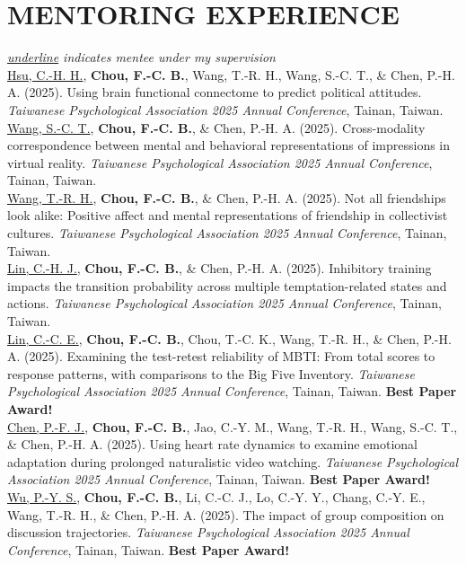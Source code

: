 \documentclass[a4paper,12pt]{article}
\newcommand{\itemspace}{7pt} %
\begin{document}
\section*{MENTORING EXPERIENCE}
\textit{\underline{underline} indicates mentee under my supervision} \\[10pt]
\noindent \underline{Hsu, C.-H. H.}, \textbf{Chou, F.-C. B.}, Wang, T.-R. H., Wang, S.-C. T., \& Chen, P.-H. A. (2025). Using brain functional connectome to predict political attitudes. \textit{Taiwanese Psychological Association 2025 Annual Conference}, Tainan, Taiwan. \\[\itemspace]
\noindent \underline{Wang, S.-C. T.}, \textbf{Chou, F.-C. B.}, \& Chen, P.-H. A. (2025). Cross-modality correspondence between mental and behavioral representations of impressions in virtual reality. \textit{Taiwanese Psychological Association 2025 Annual Conference}, Tainan, Taiwan. \\[\itemspace]
\noindent \underline{Wang, T.-R. H.}, \textbf{Chou, F.-C. B.}, \& Chen, P.-H. A. (2025). Not all friendships look alike: Positive affect and mental representations of friendship in collectivist cultures. \textit{Taiwanese Psychological Association 2025 Annual Conference}, Tainan, Taiwan. \\[\itemspace]
\noindent \underline{Lin, C.-H. J.}, \textbf{Chou, F.-C. B.}, \& Chen, P.-H. A. (2025). Inhibitory training impacts the transition probability across multiple temptation-related states and actions. \textit{Taiwanese Psychological Association 2025 Annual Conference}, Tainan, Taiwan. \\[\itemspace]
\noindent \underline{Lin, C.-C. E.}, \textbf{Chou, F.-C. B.}, Chou, T.-C. K., Wang, T.-R. H., \& Chen, P.-H. A. (2025). Examining the test-retest reliability of MBTI: From total scores to response patterns, with comparisons to the Big Five Inventory. \textit{Taiwanese Psychological Association 2025 Annual Conference}, Tainan, Taiwan. \textbf{Best Paper Award!} \\[\itemspace]
\noindent \underline{Chen, P.-F. J.}, \textbf{Chou, F.-C. B.}, Jao, C.-Y. M., Wang, T.-R. H., Wang, S.-C. T., \& Chen, P.-H. A. (2025). Using heart rate dynamics to examine emotional adaptation during prolonged naturalistic video watching. \textit{Taiwanese Psychological Association 2025 Annual Conference}, Tainan, Taiwan.  \textbf{Best Paper Award!} \\[\itemspace]
\noindent \underline{Wu, P.-Y. S.}, \textbf{Chou, F.-C. B.}, Li, C.-C. J., Lo, C.-Y. Y., Chang, C.-Y. E., Wang, T.-R. H., \& Chen, P.-H. A. (2025). The impact of group composition on discussion trajectories. \textit{Taiwanese Psychological Association 2025 Annual Conference}, Tainan, Taiwan. \textbf{Best Paper Award!} \\[\itemspace]
\end{document}
